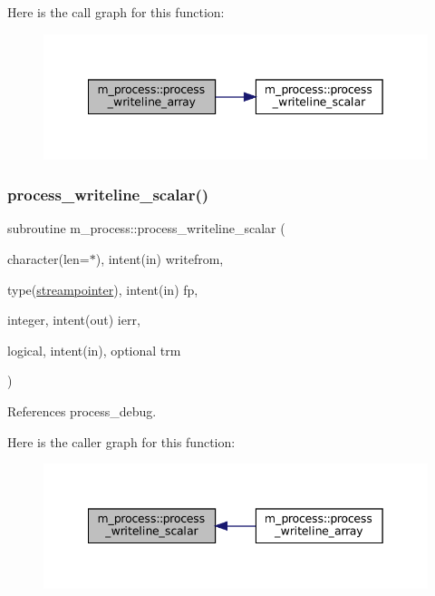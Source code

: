 Here is the call graph for this function\+:\nopagebreak
\begin{figure}[H]
\begin{center}
\leavevmode
\includegraphics[width=342pt]{namespacem__process_a08887a918eba167ceacddf58ca084270_cgraph}
\end{center}
\end{figure}
\mbox{\label{namespacem__process_a72527c0ec0af26dcb14b8bfad6dcd482}} 
\subsubsection{\texorpdfstring{process\+\_\+writeline\+\_\+scalar()}{process\_writeline\_scalar()}}
{\footnotesize\ttfamily subroutine m\+\_\+process\+::process\+\_\+writeline\+\_\+scalar (\begin{DoxyParamCaption}\item[{character(len=$\ast$), intent(in)}]{writefrom,  }\item[{type(\mbox{\hyperlink{structm__process_1_1streampointer}{streampointer}}), intent(in)}]{fp,  }\item[{integer, intent(out)}]{ierr,  }\item[{logical, intent(in), optional}]{trm }\end{DoxyParamCaption})\hspace{0.3cm}{\ttfamily [private]}}



References process\+\_\+debug.

Here is the caller graph for this function\+:\nopagebreak
\begin{figure}[H]
\begin{center}
\leavevmode
\includegraphics[width=342pt]{namespacem__process_a72527c0ec0af26dcb14b8bfad6dcd482_icgraph}
\end{center}
\end{figure}


